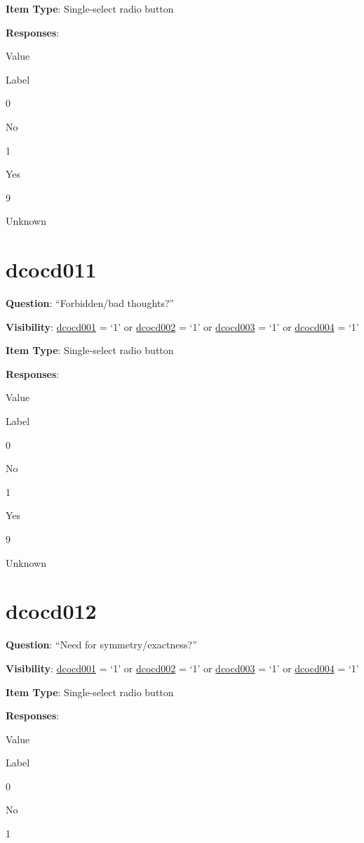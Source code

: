 \documentclass[]{book}
\begin{document}
\textbf{Item Type}: Single-select radio button

\textbf{Responses}:

Value

Label

0

No

1

Yes

9

Unknown

\hypertarget{dcocd011}{%
\section{dcocd011}\label{dcocd011}}

\textbf{Question}: ``Forbidden/bad thoughts?''

\textbf{Visibility}: \protect\hyperlink{dcocd001}{dcocd001} = `1' or \protect\hyperlink{dcocd002}{dcocd002} = `1' or \protect\hyperlink{dcocd003}{dcocd003} = `1' or \protect\hyperlink{dcocd004}{dcocd004} = `1'

\textbf{Item Type}: Single-select radio button

\textbf{Responses}:

Value

Label

0

No

1

Yes

9

Unknown

\hypertarget{dcocd012}{%
\section{dcocd012}\label{dcocd012}}

\textbf{Question}: ``Need for symmetry/exactness?''

\textbf{Visibility}: \protect\hyperlink{dcocd001}{dcocd001} = `1' or \protect\hyperlink{dcocd002}{dcocd002} = `1' or \protect\hyperlink{dcocd003}{dcocd003} = `1' or \protect\hyperlink{dcocd004}{dcocd004} = `1'

\textbf{Item Type}: Single-select radio button

\textbf{Responses}:

Value

Label

0

No

1
\end{document}
